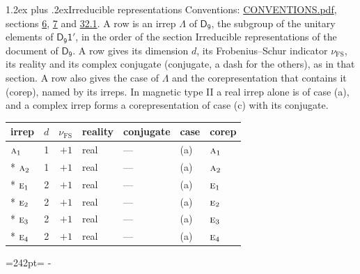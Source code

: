 \documentclass[10pt,a4paper]{article}
\makeatletter
\renewcommand\section{\@startsection{section}{1}{\z@}{-3ex plus -1ex minus -.2ex}%
  {1.2ex plus .2ex}{\normalfont\large\sffamily\bfseries\color{parttitle}}}
\newcommand{\needspace}[1]{\par\penalty-100\begingroup\dimen0=#1\relax\dimen2=\pagegoal
  \advance\dimen2-\pagetotal\ifdim\dimen0>\dimen2\relax\ifdim\dimen2>0pt\vfil\break\fi\fi
  \endgroup}
\numberwithin{equation}{section}
\newcommand{\grp}[1]{\mathsf{#1}}
\newcommand{\irr}[1]{\text{\normalfont\scshape #1}}
\newcommand{\fsind}{\nu_{\mathrm{FS}}}
\makeatother
\begin{document}
\section{Irreducible representations}\label{s:irreps}
Conventions: \href{../../CONVENTIONS.pdf}{CONVENTIONS.pdf}, sections \href{../../../rotation/CONVENTIONS.pdf\#conv.6}{6}, \href{../../../rotation/CONVENTIONS.pdf\#conv.7}{7} and \href{../../CONVENTIONS.pdf\#conv.32.1}{32.1}.
\leavevmode\label{n:irrep.Delta}A row is an irrep $\Lambda$ of $\grp{D_{9}}$, the subgroup of the unitary elements of $\grp{D_{9}1'}$, in the order of the section Irreducible representations of the document of \href{../../../rotation/data/pdf/D9.pdf}{$\grp{D_{9}}$}. \label{n:index.dimension}\label{n:index.frobenius}\label{n:head.irrep}\label{n:head.reality}\label{n:head.conjugate}A row gives its dimension $d$, its Frobenius--Schur indicator $\fsind$, its reality and its complex conjugate (conjugate, a dash for the others), as in that section. \label{n:head.case.corep}\label{n:head.corep}A row also gives the case of $\Lambda$ and the corepresentation that contains it (corep), named by its irreps. In magnetic type II a real irrep alone is of case (a), and a complex irrep forms a corepresentation of case (c) with its conjugate.
\setlength{\emergencystretch}{2em}\par\setlength{\emergencystretch}{0pt}
{\small\renewcommand{\arraystretch}{1.25}\setlength{\tabcolsep}{4pt}\begin{longtable}{@{}lrrllll@{}}\toprule
irrep & $d$ & $\fsind$ & reality & conjugate & case & corep\\\midrule\endhead
\bottomrule\endfoot\endlastfoot
$\irr{a}_{1}$ & 1 & $+1$ & real & --- & (a) & $\irr{a}_{1}$\\*
$\irr{a}_{2}$ & 1 & $+1$ & real & --- & (a) & $\irr{a}_{2}$\\*
$\irr{e}_{1}$ & 2 & $+1$ & real & --- & (a) & $\irr{e}_{1}$\\*
$\irr{e}_{2}$ & 2 & $+1$ & real & --- & (a) & $\irr{e}_{2}$\\*
$\irr{e}_{3}$ & 2 & $+1$ & real & --- & (a) & $\irr{e}_{3}$\\*
$\irr{e}_{4}$ & 2 & $+1$ & real & --- & (a) & $\irr{e}_{4}$\\
\bottomrule\end{longtable}}
\needspace{242pt}
\end{document}
